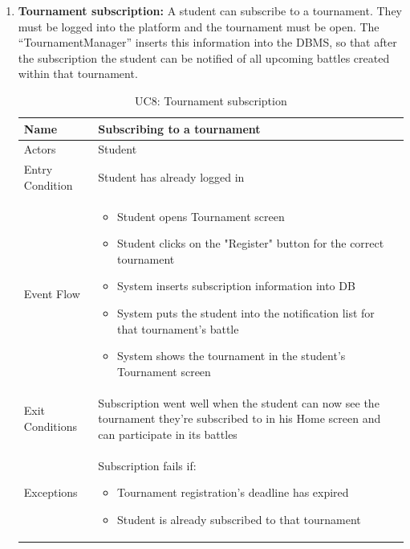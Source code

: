 \begin{enumerate}
   \newpage

   \item \textbf{Tournament subscription:}
   A student can subscribe to a tournament. They must be logged into the platform and the tournament must be open. The “TournamentManager” inserts this information into the DBMS, so that after the subscription the student can be notified of all upcoming battles created within that tournament. 
   
   \begin{table}[H]
       \centering
       \begin{tabular}{|l|m{11cm}|}
        \hline
            Name & Subscribing to a tournament\\
        \hline
            Actors & Student\\
        \hline
            Entry Condition & Student has already logged in\\
        \hline
            Event Flow & 
            \begin{itemize}
                \item Student opens Tournament screen
                \item Student clicks on the "Register" button for the correct tournament
                \item System inserts subscription information into DB
                \item System puts the student into the notification list for that tournament's battle
                \item System shows the tournament in the student's Tournament screen
            \end{itemize}\\
        \hline
            Exit Conditions & Subscription went well when the student can now see the tournament they're subscribed to in his Home screen and can participate in its battles\\
        \hline
            Exceptions & Subscription fails if: 
            \begin{itemize}
                \item Tournament registration's deadline has expired
                \item Student is already subscribed to that tournament
            \end{itemize}\\
        \hline
       \end{tabular}
       \caption{UC8: Tournament subscription}
       \label{tab:uc8}
   \end{table}


\end{enumerate}
